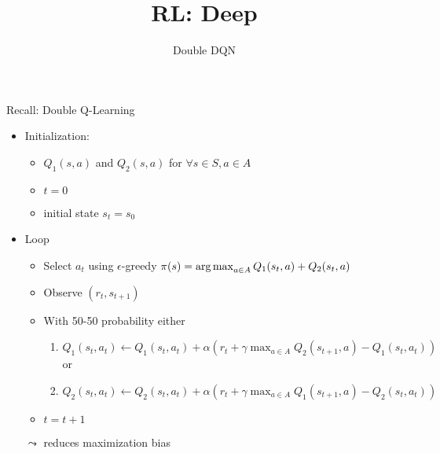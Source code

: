 


\title[RL: Deep Reinforcement Learning]{RL: Deep}
\subtitle{Double DQN}




	
	\maketitle

\begin{frame}[c]{Recall: Double Q-Learning}
	
	\begin{itemize}
		\item Initialization:
		\begin{itemize}
			\item $Q_1(s,a)$ and $Q_2(s,a)$ for $\forall s \in S, a\in A$
			\item $t= 0$
			\item initial state $s_t = s_0$
		\end{itemize}
		\item Loop
		\begin{itemize}
			\item Select $a_t$ using $\epsilon$-greedy $\pi(s) = \operatorname*{arg\,max}_{a \in A} Q_1(s_t, a) + Q_2(s_t , a)$
			\item Observe $(r_t, s_{t+1})$
			\item With 50-50 probability either
			\begin{enumerate}
				\item $Q_1(s_t, a_t) \gets Q_1(s_t, a_t) + \alpha (r_t +\gamma \max_{a\in A} Q_2(s_{t+1}, a) - Q_1(s_t, a_t))$\\
				or
				\item $Q_2(s_t, a_t) \gets Q_2(s_t, a_t) + \alpha (r_t +\gamma \max_{a\in A} Q_1(s_{t+1}, a) - Q_2(s_t, a_t))$
			\end{enumerate}
			\item $t = t + 1 $
		\end{itemize}
	
		\bigskip
		\pause
		\item[$\leadsto$] reduces maximization bias
	\end{itemize}
	
\end{frame}
